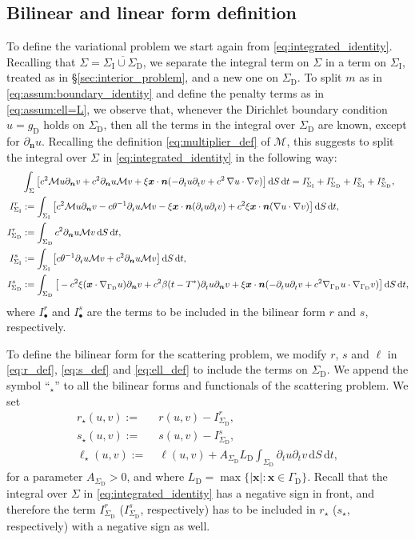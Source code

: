 \documentclass[a4paper]{article}
\theoremstyle{plain}
\theoremstyle{definition}
\newcommand{\operator}[1]{\mathcal{#1}}
\newcommand{\dt}{{\,\mathrm{d}t}}
\newcommand{\dS}{{\,\mathrm{d}S}}
\newcommand{\Grad}[1]{\nabla #1}
\newcommand{\TimeDer}{{\partial^{}_t}}
\newcommand{\NormDer}{{\partial_{\bm{n}}}}
\newcommand{\vect}[1]{\bm{#1}}
\newcommand{\LD}{L_{\mathrm D}}
\newcommand{\GD}{{\Gamma_{\mathrm D}}}
\newcommand{\SD}{{\Sigma_{\mathrm D}}}
\newcommand{\SI}{{\Sigma_{\mathrm I}}}
\newcommand{\gD}{{g_{\mathrm D}}}
\newcommand{\oM}{{\operator{M}}}
\newcommand{\vx}{{\vect x}}
\newcommand{\GradGD}{{\Grad_{\GD}}}
\begin{document}
\subsection{Bilinear and linear form definition}
To define the variational problem we start again from \eqref{eq:integrated_identity}.
Recalling that $\Sigma = \overline{\SI \cup \SD}$, we separate the integral term on $\Sigma$ in a term on $\SI$, treated as in \S\ref{sec:interior_problem}, and a new one on $\SD$.
To split $m$ as in \eqref{eq:assum:boundary_identity} and define the penalty terms as in \eqref{eq:assum:ell=L}, we observe that,
whenever the Dirichlet boundary condition $u = \gD$ holds on $\SD$, then all the terms in the integral over $\SD$ are known, except for $\NormDer u$. Recalling the definition \eqref{eq:multiplier_def} of $\operator M$, this suggests to split the integral over $\Sigma$ in \eqref{eq:integrated_identity} in the following way:
\begin{align*}
&\int_\Sigma \big[c^2 \operator{M} u\NormDer{v} + c^2\NormDer{u} \operator{M} v
				+ \xi \vect{x} \cdot \vect{n} (- \TimeDer{u} \TimeDer{v}
				+ c^2 \,\Grad u \cdot \Grad v) \big] \dS\dt
= I^r_{\SI} + I^r_{\SD} + I^s_{\SI} + I^s_{\SD},
\\
I^r_{\SI} & := \int_{\SI} \big[c^2 \oM u\NormDer{v} - c\theta^{-1} \TimeDer u \oM v - \xi \vect{x} \cdot \vect{n} (\TimeDer{u} \TimeDer{v})+ c^2 \xi \vect{x} \cdot \vect{n} (\Grad u \cdot \Grad v)  \big]\dS\dt,\\
I^r_{\SD} & := \int_{\SD} c^2  \NormDer u \oM v \dS \dt,\\
I^s_{\SI} & := \int_{\SI} \big[c\theta^{-1}  \TimeDer u\oM v + c^2  \NormDer u\oM v \big]\dS \dt, \\
I^s_{\SD} & := \int_{\SD} \big[- c^2 \xi(\vx \cdot \GradGD u)\NormDer v + c^2 \beta (t-T^*) \TimeDer u \NormDer v
+ \xi \vect{x} \cdot \vect{n}(- \TimeDer u \TimeDer v+c^2 \GradGD u \cdot \GradGD v )\big] \dS \dt,
\end{align*}
where $I^r_{\bullet}$ and $I^s_{\bullet}$ are the terms to be included in the bilinear form $r$ and $s$, respectively.

To define the bilinear form for the scattering problem, we modify $r$, $s$ and $\ell$ in \eqref{eq:r_def}, \eqref{eq:s_def} and \eqref{eq:ell_def} to include
the terms on $\SD$.
We append the symbol ``$_\star$'' to all the bilinear forms and functionals of the scattering problem.
We set
\begin{align}
\nonumber r_{\star}(u, v) :=& \; r(u, v) - I_\SD^r, \\
\label{eq:rslScatter} s_{\star}(u, v) :=& \; s(u, v) - I_\SD^s, \\
\nonumber \ell_\star (u, v) :=&\; \ell(u, v) + A_\SD \LD \int_\SD \TimeDer u \TimeDer v \dS \dt,
\end{align}
for a parameter $A_\SD>0$, and where $\LD=\max\{|\vx|:\vx\in \GD\}$.
Recall that the integral over $\Sigma$ in \eqref{eq:integrated_identity} has a negative sign in front, and therefore the term $I_\SD^r$ ($I_\SD^s$, respectively) has to be included in $r_\star$ ($s_\star$, respectively) with a negative sign as well.
\end{document}
